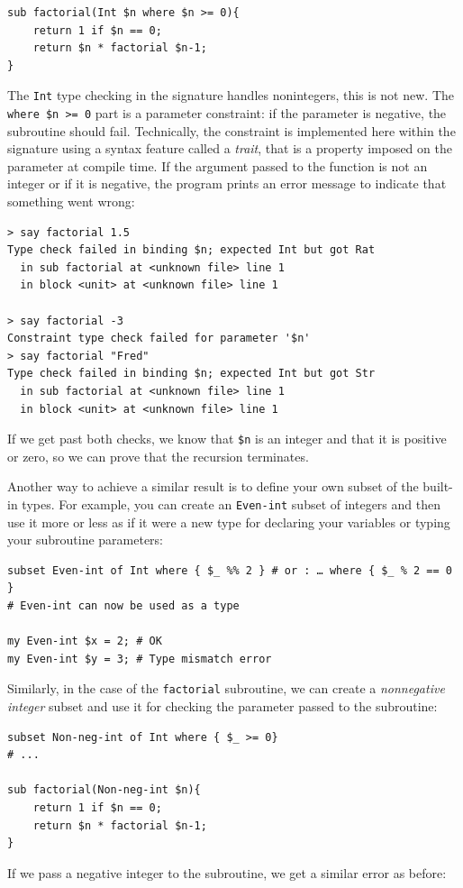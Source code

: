 \begin{verbatim}
sub factorial(Int $n where $n >= 0){
    return 1 if $n == 0;
    return $n * factorial $n-1;
}
\end{verbatim}
%
The {\tt Int} type checking in the signature handles 
nonintegers, this is not new. The {\tt where \$n >= 0} 
part is a parameter constraint: if the parameter is negative, 
the subroutine should fail.  Technically, the constraint is 
implemented here within the signature using a syntax feature 
called a \emph{trait}, that is a property imposed on the 
parameter at compile time. If the argument passed to the 
function is not an integer or if it is negative, the program prints
an error message to indicate that something went wrong:

\begin{verbatim}
> say factorial 1.5
Type check failed in binding $n; expected Int but got Rat
  in sub factorial at <unknown file> line 1
  in block <unit> at <unknown file> line 1

> say factorial -3
Constraint type check failed for parameter '$n'
> say factorial "Fred"
Type check failed in binding $n; expected Int but got Str
  in sub factorial at <unknown file> line 1
  in block <unit> at <unknown file> line 1
\end{verbatim}
% 
If we get past both checks, we know that \verb'$n' is an 
integer and that it is positive or zero, so we can prove 
that the recursion terminates.


Another way to achieve a similar result is to define your own 
subset of the built-in types. For example, you can create an 
{\tt Even-int} subset of integers and then use it more or less 
as if it were a new type for declaring your variables or 
typing your subroutine parameters:

\begin{verbatim}
subset Even-int of Int where { $_ %% 2 } # or : … where { $_ % 2 == 0 }
# Even-int can now be used as a type

my Even-int $x = 2; # OK
my Even-int $y = 3; # Type mismatch error
\end{verbatim}

Similarly, in the case of the {\tt factorial} subroutine, we 
can create a \emph{nonnegative integer} subset and use it 
for checking the parameter passed to the subroutine:

\begin{verbatim}
subset Non-neg-int of Int where { $_ >= 0}
# ...

sub factorial(Non-neg-int $n){
    return 1 if $n == 0;
    return $n * factorial $n-1;
}
\end{verbatim}
%
If we pass a negative integer to the subroutine, we get 
a similar error as before:

